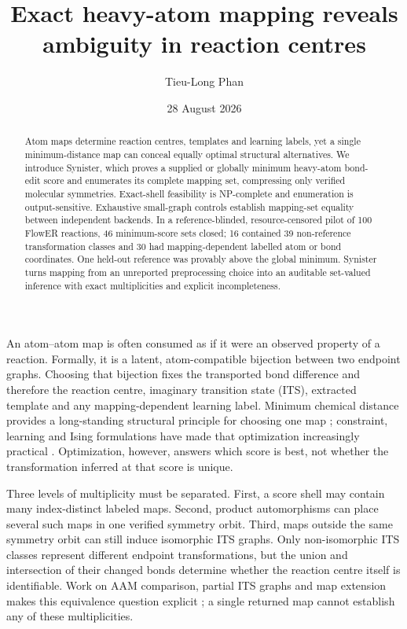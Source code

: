 \documentclass[11pt]{article}
\title{\textbf{Exact heavy-atom mapping reveals ambiguity in reaction
centres}}
\author{Tieu-Long Phan}
\date{28 August 2026}
\begin{document}
\maketitle

\begin{abstract}
Atom maps determine reaction centres, templates and learning labels, yet a
single minimum-distance map can conceal equally optimal structural
alternatives.  We introduce Synister, which proves a supplied or globally
minimum heavy-atom bond-edit score and enumerates its complete mapping set,
compressing only verified molecular symmetries.  Exact-shell feasibility is
NP-complete and enumeration is output-sensitive.  Exhaustive small-graph
controls establish mapping-set equality between independent backends.  In a
reference-blinded, resource-censored pilot of 100 FlowER reactions, 46
minimum-score sets closed; 16 contained 39 non-reference transformation
classes and 30 had mapping-dependent labelled atom or bond coordinates.  One
held-out reference was provably above the global minimum.  Synister turns
mapping from an unreported preprocessing choice into an auditable set-valued
inference with exact multiplicities and explicit incompleteness.
\end{abstract}

An atom--atom map is often consumed as if it were an observed property of a
reaction.  Formally, it is a latent, atom-compatible bijection between two
endpoint graphs.  Choosing that bijection fixes the transported bond
difference and therefore the reaction centre, imaginary transition state
(ITS), extracted template and any mapping-dependent learning label.  Minimum
chemical distance provides a long-standing structural principle for choosing
one map \citep{jochum1980pmcd}; constraint, learning and Ising formulations
have made that optimization increasingly practical
\citep{mann2014constraint,schwaller2021grammar,ali2025ising}.  Optimization,
however, answers which score is best, not whether the transformation inferred
at that score is unique.

Three levels of multiplicity must be separated.  First, a score shell may
contain many index-distinct labeled maps.  Second, product automorphisms can
place several such maps in one verified symmetry orbit.  Third, maps outside
the same symmetry orbit can still induce isomorphic ITS graphs.  Only
non-isomorphic ITS classes represent different endpoint transformations, but
the union and intersection of their changed bonds determine whether the
reaction centre itself is identifiable.  Work on AAM comparison, partial ITS
graphs and map extension makes this equivalence question explicit
\citep{gonzalez2023comparison,gonzalez2024partial,gonzalez2025extension}; a
single returned map cannot establish any of these multiplicities.
\end{document}
